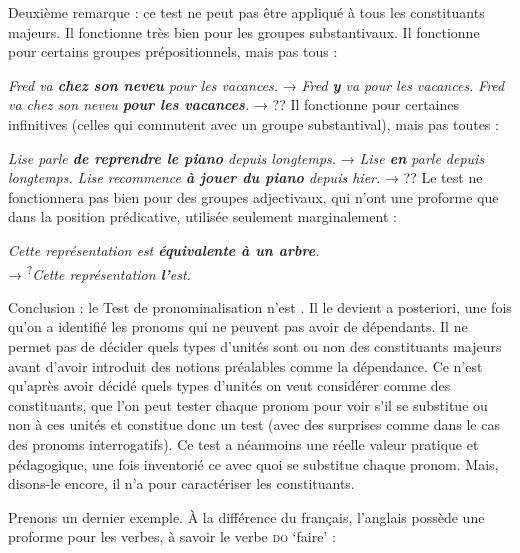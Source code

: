 {    Deuxième remarque : ce test ne peut pas être appliqué à tous les constituants majeurs. Il fonctionne très bien pour les groupes substantivaux. Il fonctionne pour certains groupes prépositionnels, mais pas tous :
    
    \ea
    \ea     \textit{{Fred va} \textbf{{chez son neveu}}  {pour les vacances.}}     \textrm{→}   \textit{{Fred} \textbf{{y}}  {va pour les vacances.}}
    \ex     \textit{{Fred va chez son neveu} \textbf{{pour les vacances}}.}     \textrm{→}  ??
    \z
    \z
    Il fonctionne pour certaines infinitives (celles qui commutent avec un groupe substantival), mais pas toutes :

    \ea
    \ea     \textit{{Lise parle} \textbf{{de reprendre le piano}}  {depuis longtemps.}}    \textrm{→}   \textit{{Lise} \textbf{{en}}  {parle depuis longtemps.}}
    \ex     \textit{{Lise recommence} \textbf{{à jouer du piano}}  {depuis hier.}}     \textrm{→}  ??
    \z
    \z
    Le test ne fonctionnera pas bien pour des groupes adjectivaux, qui n’ont une proforme que dans la position prédicative, utilisée seulement marginalement :

    \ea
    \textit{{Cette représentation est} \textbf{{équivalente à un arbre}}.}\\    \textrm{→}  \textsuperscript{?}\textit{{Cette représentation} \textbf{{l’}}{est.}}
    \z

    Conclusion : le Test de pronominalisation n’est . Il le devient a posteriori, une fois qu’on a identifié les pronoms qui ne peuvent pas avoir de dépendants. Il ne permet pas de décider quels types d’unités sont ou non des constituants majeurs avant d’avoir introduit des notions préalables comme la dépendance. Ce n’est qu’après avoir décidé quels types d’unités on veut considérer comme des constituants, que l’on peut tester chaque pronom pour voir s’il se substitue ou non à ces unités et constitue donc un test (avec des surprises comme dans le cas des pronoms interrogatifs). Ce test a néanmoins une réelle valeur pratique et pédagogique, une fois inventorié ce avec quoi se substitue chaque pronom. Mais, disons-le encore, il n’a  pour caractériser les constituants.

    Prenons un dernier exemple. À la différence du français, l’anglais possède une proforme pour les verbes, à savoir le verbe \textsc{do} ‘faire’ :
    
}
